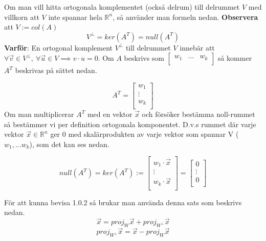 \documentclass{report}
\begin{document}
{
Om man vill hitta ortogonala komplementet (också delrum) till delrummet $ V $ med villkorn att $ V $ inte spannar hela $ \mathbb{R}^n $, så använder man formeln nedan. \textbf{Observera} att $ V := col(A) $
\[
	V^\perp = ker(A^T) = null(A^T)
\]
	\textbf{Varför}: En ortogonal komplement $ V^\perp $ till delrummet $ V $ innebär att $ \forall \vec{v} \in V^\perp,\: \forall \vec{u} \in V \implies  v \cdot u = 0$. Om $ A $ beskrivs som $ 
\begin{bmatrix}
	w_1 & \ldots  & w_k \\
\end{bmatrix}
$ så kommer $ A^T $ beskrivas på sättet nedan.

\[ A^T =
\begin{bmatrix}
	w_1 \\
	\vdots \\
	w_k \\
\end{bmatrix}
\]
Om man multiplicerar $ A^T $ med en vektor $ \vec{x}  $ och försöker bestämma noll-rummet så bestämmer vi per definition ortogonala komponentet. D.v.s rummet där varje vektor $ \vec{x} \in \mathbb{R}^n $ ger 0 med skalärprodukten av varje vektor som spannar V ($ w_1, \ldots w_k $), som det kan ses nedan.

\[
null(A^T) = ker(A^T) :=
\begin{bmatrix}
	w_1 \cdot \vec{x}  \\
	\vdots \\
	w_k \cdot \vec{x} \\
\end{bmatrix} =
\begin{bmatrix}
	0 \\
	\vdots \\
	0 \\
\end{bmatrix}
\]

}

{
För att kunna bevisa 1.0.2 så brukar man använda denna sats som beskrivs nedan.
\[
	\vec{x} = proj_W \vec{x} + proj_{W^\perp} \vec{x}  
\]
\[
		proj_{W^\perp} \vec{x} = \vec{x} - proj_W \vec{x} 
\]


}
\end{document}
